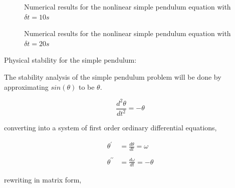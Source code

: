 \documentclass[a4paper,11pt]{report}
\begin{document}
\begin{enumerate}
    \begin{figure}[H]
    \centering
    \resizebox{0.95\linewidth}{!}{}
    \end{figure}

    \begin{figure}[H]
    \centering
    \resizebox{0.95\linewidth}{!}{}
    \caption{Numerical results for the nonlinear simple pendulum equation
    with $\delta t = 10s$}
    \end{figure}

    \begin{figure}[H]
    \centering
    \resizebox{0.95\linewidth}{!}{}
    \end{figure}

    \begin{figure}[H]
    \centering
    \resizebox{0.95\linewidth}{!}{}
    \caption{Numerical results for the nonlinear simple pendulum equation
    with $\delta t = 20s$}
    \end{figure}

    \pagebreak

    Physical stability for the simple pendulum:
    
    The stability analysis of the simple pendulum problem will be done by 
    approximating $sin(\theta)$ to be $\theta$.

    \begin{equation*}
    \frac{d^2 \theta}{dt^2} = - \theta
    \end{equation*}

    converting into a system of first order ordinary differential equations,

    \begin{equation*}
    \begin{aligned}
    \theta^{\prime} &= \frac{d \theta}{dt} = \omega \\ \\
    \theta^{\prime\prime} &= \frac{d \omega}{dt} = - \theta
    \end{aligned}
    \end{equation*}

    rewriting in matrix form,
        

\end{enumerate}
\end{document}
